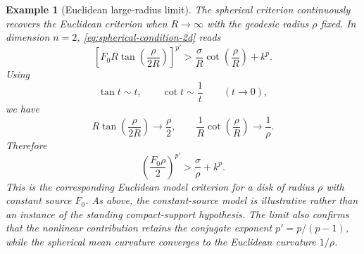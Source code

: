 \documentclass{article}
\renewcommand{\boxed}[1]{#1}
\newtheorem{example}[theorem]{Example}
\begin{document}
\begin{example}[Euclidean large-radius limit]
The spherical criterion continuously recovers the Euclidean criterion when
$R\to\infty$ with the geodesic radius $\rho$ fixed. In dimension $n=2$,
\eqref{eq:spherical-condition-2d} reads
\[
\left[
F_0R\tan\left(\frac\rho{2R}\right)
\right]^{p'}
>
\frac\sigma R\cot\left(\frac\rho R\right)+k^p.
\]
Using
\[
\tan t\sim t,
\qquad
\cot t\sim\frac1t
\qquad(t\to0),
\]
we have
\[
R\tan\left(\frac\rho{2R}\right)\longrightarrow\frac\rho2,
\qquad
\frac1R\cot\left(\frac\rho R\right)\longrightarrow\frac1\rho.
\]
Therefore
\[
\boxed{
\left(\frac{F_0\rho}{2}\right)^{p'}
>
\frac\sigma\rho+k^p.
}
\]
This is the corresponding Euclidean model criterion for a disk of radius
$\rho$ with constant source $F_0$. As above, the constant-source model
is illustrative rather than an instance of the standing compact-support
hypothesis. The limit also confirms
that the nonlinear contribution retains the conjugate exponent
$p'=p/(p-1)$, while the spherical mean curvature converges to the
Euclidean curvature $1/\rho$.
\end{example}
\end{document}
